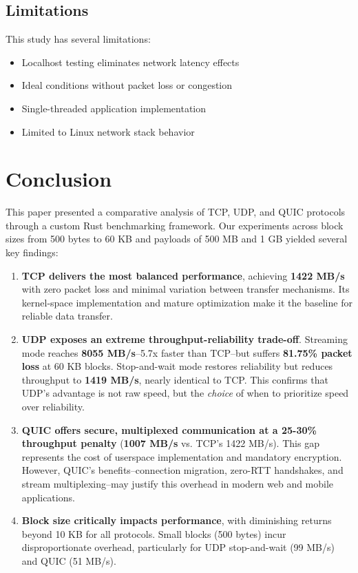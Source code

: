 \documentclass[12pt,a4paper]{article}
\begin{document}
\subsection{Limitations}

This study has several limitations:
\begin{itemize}
    \item Localhost testing eliminates network latency effects
    \item Ideal conditions without packet loss or congestion
    \item Single-threaded application implementation
    \item Limited to Linux network stack behavior
\end{itemize}

\section{Conclusion}

This paper presented a comparative analysis of TCP, UDP, and QUIC protocols through a custom Rust benchmarking framework. Our experiments across block sizes from 500 bytes to 60 KB and payloads of 500 MB and 1 GB yielded several key findings:

\begin{enumerate}
    \item \textbf{TCP delivers the most balanced performance}, achieving \textbf{1422 MB/s} with zero packet loss and minimal variation between transfer mechanisms. Its kernel-space implementation and mature optimization make it the baseline for reliable data transfer.

    \item \textbf{UDP exposes an extreme throughput-reliability trade-off}. Streaming mode reaches \textbf{8055 MB/s}--5.7x faster than TCP--but suffers \textbf{81.75\% packet loss} at 60 KB blocks. Stop-and-wait mode restores reliability but reduces throughput to \textbf{1419 MB/s}, nearly identical to TCP. This confirms that UDP's advantage is not raw speed, but the \textit{choice} of when to prioritize speed over reliability.

    \item \textbf{QUIC offers secure, multiplexed communication at a 25-30\% throughput penalty} (\textbf{1007 MB/s} vs. TCP's 1422 MB/s). This gap represents the cost of userspace implementation and mandatory encryption. However, QUIC's benefits--connection migration, zero-RTT handshakes, and stream multiplexing--may justify this overhead in modern web and mobile applications.

    \item \textbf{Block size critically impacts performance}, with diminishing returns beyond 10 KB for all protocols. Small blocks (500 bytes) incur disproportionate overhead, particularly for UDP stop-and-wait (99 MB/s) and QUIC (51 MB/s).
\end{enumerate}
\end{document}
